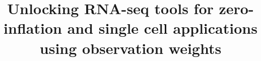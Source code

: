 \documentclass{bmcart}
\begin{document}
\begin{frontmatter}

\begin{fmbox}


\title{Unlocking RNA-seq tools for zero-inflation and single cell applications using observation weights}


\author[
   addressref={aff1,aff2},                   %
   noteref={n1},                        %
   email={koen.vandenberge@ugent.be}   %
]{ }
\author[
    addressref={aff3},
       noteref={n1},
    email={fperraudeau@berkeley.edu}
]{  }

\author[
    addressref={aff4,aff5},
    email={charlotte.soneson@uzh.ch}
]{  }
\author[
    addressref={aff6},
    email={milove@email.unc.edu}
]{  }
\author[
    addressref={aff7},
    email={dar2062@med.cornell.edu}
]{  }
\author[
    addressref={aff8,aff9,aff10,aff11},
    email={jean-philippe.vert@curie.fr}
]{  }
\author[
    addressref={aff4,aff5},
    email={mark.robinson@imls.uzh.ch}
]{  }
\author[
    addressref={aff3, aff12},
    email={sandrine@stat.berkeley.edu}
]{  }


\end{fmbox}
\end{frontmatter}
\end{document}
